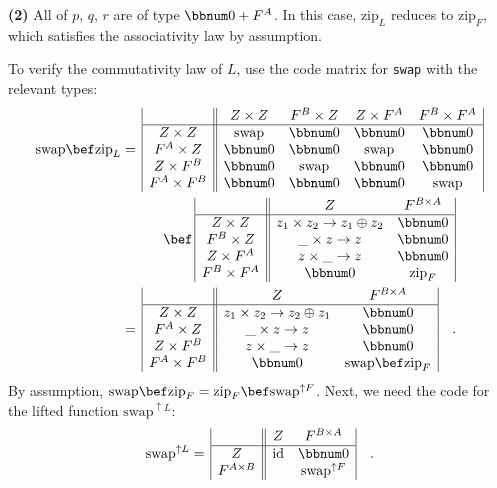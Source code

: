 \textbf{(2)} All of $p$, $q$, $r$ are of type $\bbnum 0+F^{A}$.
In this case, $\text{zip}_{L}$ reduces to $\text{zip}_{F}$, which
satisfies the associativity law by assumption.

To verify the commutativity law of $L$, use the code matrix for \lstinline!swap!
with the relevant types:
\begin{align*}
\text{swap}\bef\text{zip}_{L} & =\,\begin{array}{|c||cccc|}
 & Z\times Z & F^{B}\times Z & Z\times F^{A} & F^{B}\times F^{A}\\
\hline Z\times Z & \text{swap} & \bbnum 0 & \bbnum 0 & \bbnum 0\\
F^{A}\times Z & \bbnum 0 & \bbnum 0 & \text{swap} & \bbnum 0\\
Z\times F^{B} & \bbnum 0 & \text{swap} & \bbnum 0 & \bbnum 0\\
F^{A}\times F^{B} & \bbnum 0 & \bbnum 0 & \bbnum 0 & \text{swap}
\end{array}\\
 & \quad\quad\quad\bef\,\begin{array}{|c||cc|}
 & Z & F^{B\times A}\\
\hline Z\times Z & z_{1}\times z_{2}\rightarrow z_{1}\oplus z_{2} & \bbnum 0\\
F^{B}\times Z & \_\times z\rightarrow z & \bbnum 0\\
Z\times F^{A} & z\times\_\rightarrow z & \bbnum 0\\
F^{B}\times F^{A} & \bbnum 0 & \text{zip}_{F}
\end{array}\\
 & =\,\begin{array}{|c||cc|}
 & Z & F^{B\times A}\\
\hline Z\times Z & z_{1}\times z_{2}\rightarrow z_{2}\oplus z_{1} & \bbnum 0\\
F^{A}\times Z & \_\times z\rightarrow z & \bbnum 0\\
Z\times F^{B} & z\times\_\rightarrow z & \bbnum 0\\
F^{A}\times F^{B} & \bbnum 0 & \text{swap}\bef\text{zip}_{F}
\end{array}\quad.
\end{align*}
By assumption, $\text{swap}\bef\text{zip}_{F}=\text{zip}_{F}\bef\text{swap}^{\uparrow F}$.
Next, we need the code for the lifted function $\text{swap}^{\uparrow L}$:
\[
\text{swap}^{\uparrow L}=\,\begin{array}{|c||cc|}
 & Z & F^{B\times A}\\
\hline Z & \text{id} & \bbnum 0\\
F^{A\times B} &  & \text{swap}^{\uparrow F}
\end{array}\quad.
\]
